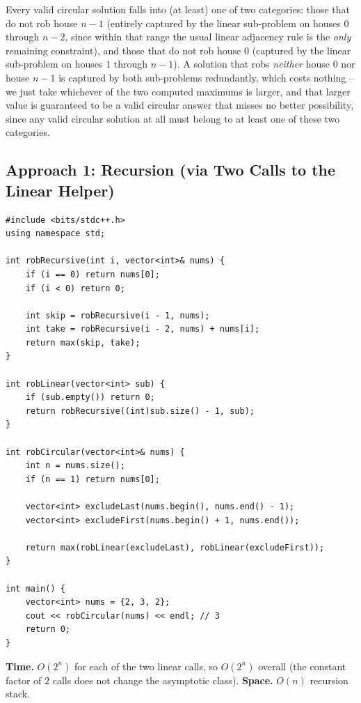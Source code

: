 Every valid circular solution falls into (at least) one of two
categories: those that do not rob house $n-1$ (entirely captured by the
linear sub-problem on houses $0$ through $n-2$, since within that range
the usual linear adjacency rule is the \emph{only} remaining constraint),
and those that do not rob house $0$ (captured by the linear sub-problem
on houses $1$ through $n-1$). A solution that robs \emph{neither} house
$0$ nor house $n-1$ is captured by both sub-problems redundantly, which
costs nothing -- we just take whichever of the two computed maximums is
larger, and that larger value is guaranteed to be a valid circular
answer that misses no better possibility, since any valid circular
solution at all must belong to at least one of these two categories.

\subsection*{Approach 1: Recursion (via Two Calls to the Linear Helper)}

\begin{lstlisting}
#include <bits/stdc++.h>
using namespace std;

int robRecursive(int i, vector<int>& nums) {
    if (i == 0) return nums[0];
    if (i < 0) return 0;

    int skip = robRecursive(i - 1, nums);
    int take = robRecursive(i - 2, nums) + nums[i];
    return max(skip, take);
}

int robLinear(vector<int> sub) {
    if (sub.empty()) return 0;
    return robRecursive((int)sub.size() - 1, sub);
}

int robCircular(vector<int>& nums) {
    int n = nums.size();
    if (n == 1) return nums[0];

    vector<int> excludeLast(nums.begin(), nums.end() - 1);
    vector<int> excludeFirst(nums.begin() + 1, nums.end());

    return max(robLinear(excludeLast), robLinear(excludeFirst));
}

int main() {
    vector<int> nums = {2, 3, 2};
    cout << robCircular(nums) << endl; // 3
    return 0;
}
\end{lstlisting}

\begin{complexitybox}
\textbf{Time.} $O(2^n)$ for each of the two linear calls, so $O(2^n)$
overall (the constant factor of $2$ calls does not change the
asymptotic class).
\textbf{Space.} $O(n)$ recursion stack.
\end{complexitybox}


